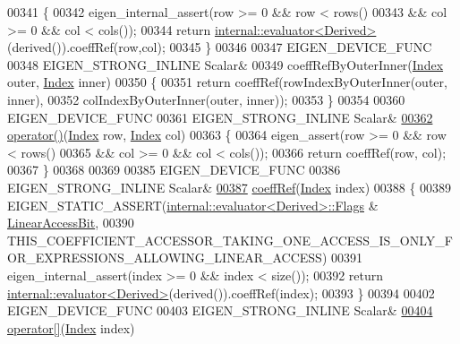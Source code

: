 \begin{DoxyCode}
00341     \{
00342       eigen\_internal\_assert(row >= 0 && row < rows()
00343                          && col >= 0 && col < cols());
00344       \textcolor{keywordflow}{return} \hyperlink{struct_eigen_1_1internal_1_1evaluator}{internal::evaluator<Derived>}(derived()).coeffRef(row,col);
00345     \}
00346 
00347     EIGEN\_DEVICE\_FUNC
00348     EIGEN\_STRONG\_INLINE Scalar&
00349     coeffRefByOuterInner(\hyperlink{group___core___module_a554f30542cc2316add4b1ea0a492ff02}{Index} outer, \hyperlink{group___core___module_a554f30542cc2316add4b1ea0a492ff02}{Index} inner)
00350     \{
00351       \textcolor{keywordflow}{return} coeffRef(rowIndexByOuterInner(outer, inner),
00352                       colIndexByOuterInner(outer, inner));
00353     \}
00354 
00360     EIGEN\_DEVICE\_FUNC
00361     EIGEN\_STRONG\_INLINE Scalar&
\hyperlink{group___core___module_ab0c40ee1944059a3e32a125cf794d547}{00362}     \hyperlink{group___core___module_ab0c40ee1944059a3e32a125cf794d547}{operator()}(\hyperlink{group___core___module_a554f30542cc2316add4b1ea0a492ff02}{Index} row, \hyperlink{group___core___module_a554f30542cc2316add4b1ea0a492ff02}{Index} col)
00363     \{
00364       eigen\_assert(row >= 0 && row < rows()
00365           && col >= 0 && col < cols());
00366       \textcolor{keywordflow}{return} coeffRef(row, col);
00367     \}
00368 
00369 
00385     EIGEN\_DEVICE\_FUNC
00386     EIGEN\_STRONG\_INLINE Scalar&
\hyperlink{group___core___module_a3187593ec72fc6f4fa64a86e0383375b}{00387}     \hyperlink{group___core___module_a3187593ec72fc6f4fa64a86e0383375b}{coeffRef}(\hyperlink{group___core___module_a554f30542cc2316add4b1ea0a492ff02}{Index} index)
00388     \{
00389       EIGEN\_STATIC\_ASSERT(\hyperlink{struct_eigen_1_1internal_1_1evaluator}{internal::evaluator<Derived>::Flags} & 
      \hyperlink{group__flags_ga4b983a15d57cd55806df618ac544d09e}{LinearAccessBit},
00390                           
      THIS\_COEFFICIENT\_ACCESSOR\_TAKING\_ONE\_ACCESS\_IS\_ONLY\_FOR\_EXPRESSIONS\_ALLOWING\_LINEAR\_ACCESS)
00391       eigen\_internal\_assert(index >= 0 && index < size());
00392       \textcolor{keywordflow}{return} \hyperlink{struct_eigen_1_1internal_1_1evaluator}{internal::evaluator<Derived>}(derived()).coeffRef(index);
00393     \}
00394 
00402     EIGEN\_DEVICE\_FUNC
00403     EIGEN\_STRONG\_INLINE Scalar&
\hyperlink{group___core___module_a38f5d78476b3db56db98853af750cf31}{00404}     \hyperlink{group___core___module_a38f5d78476b3db56db98853af750cf31}{operator[]}(\hyperlink{group___core___module_a554f30542cc2316add4b1ea0a492ff02}{Index} index)

\end{DoxyCode}
